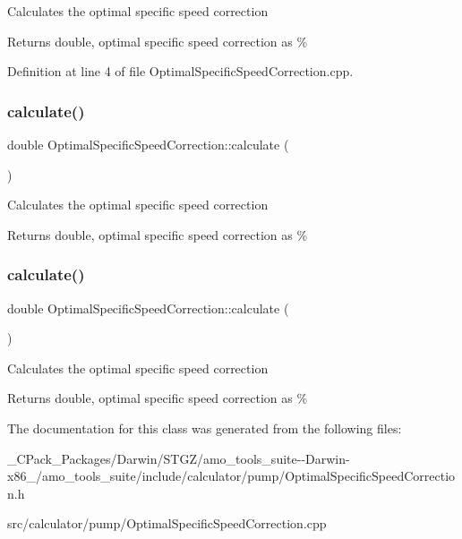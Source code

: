 Calculates the optimal specific speed correction \begin{DoxyReturn}{Returns}
double, optimal specific speed correction as \% 
\end{DoxyReturn}


Definition at line 4 of file Optimal\+Specific\+Speed\+Correction.\+cpp.

\mbox{\label{class_optimal_specific_speed_correction_a3337ebde4e64c20f19adbda6204fa0be}} 
\subsubsection{\texorpdfstring{calculate()}{calculate()}\hspace{0.1cm}{\footnotesize\ttfamily [2/3]}}
{\footnotesize\ttfamily double Optimal\+Specific\+Speed\+Correction\+::calculate (\begin{DoxyParamCaption}{ }\end{DoxyParamCaption})}

Calculates the optimal specific speed correction \begin{DoxyReturn}{Returns}
double, optimal specific speed correction as \% 
\end{DoxyReturn}
\mbox{\label{class_optimal_specific_speed_correction_a3337ebde4e64c20f19adbda6204fa0be}} 
\subsubsection{\texorpdfstring{calculate()}{calculate()}\hspace{0.1cm}{\footnotesize\ttfamily [3/3]}}
{\footnotesize\ttfamily double Optimal\+Specific\+Speed\+Correction\+::calculate (\begin{DoxyParamCaption}{ }\end{DoxyParamCaption})}

Calculates the optimal specific speed correction \begin{DoxyReturn}{Returns}
double, optimal specific speed correction as \% 
\end{DoxyReturn}


The documentation for this class was generated from the following files\+:\begin{DoxyCompactItemize}
\item 
\+\_\+\+C\+Pack\+\_\+\+Packages/\+Darwin/\+S\+T\+G\+Z/amo\+\_\+tools\+\_\+suite-\/-\/\+Darwin-\/x86\+\_/amo\+\_\+tools\+\_\+suite/include/calculator/pump/Optimal\+Specific\+Speed\+Correction.\+h\item 
src/calculator/pump/Optimal\+Specific\+Speed\+Correction.\+cpp\end{DoxyCompactItemize}
